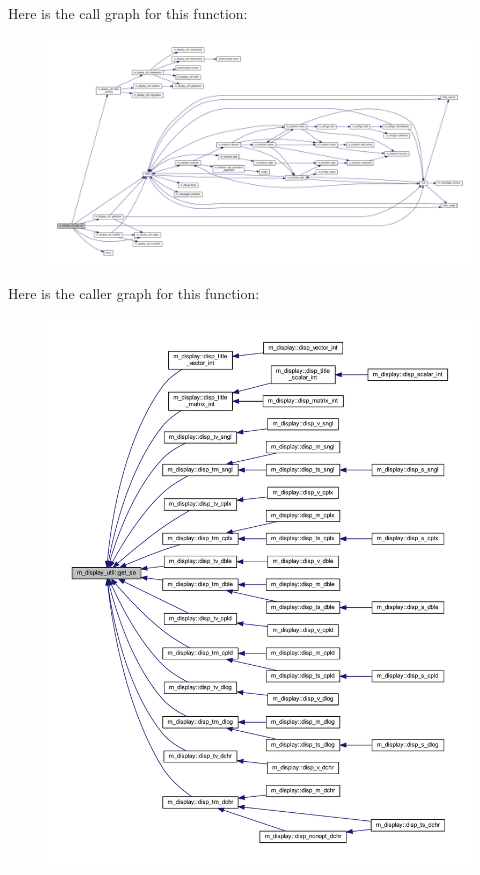 Here is the call graph for this function\+:
\nopagebreak
\begin{figure}[H]
\begin{center}
\leavevmode
\includegraphics[width=350pt]{namespacem__display__util_a04585c4fe921b2423a6cfc1ad21a40b7_cgraph}
\end{center}
\end{figure}
Here is the caller graph for this function\+:
\nopagebreak
\begin{figure}[H]
\begin{center}
\leavevmode
\includegraphics[width=350pt]{namespacem__display__util_a04585c4fe921b2423a6cfc1ad21a40b7_icgraph}
\end{center}
\end{figure}
\mbox{\label{namespacem__display__util_a093be898cc19ed648b45e728b72d4f5f}} 
